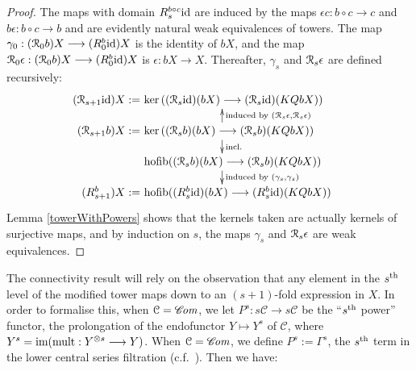 \documentclass[11pt]{amsart} \renewcommand{\baselinestretch}{1.2}
\theoremstyle{plain}
\numberwithin{equation}{section} %
\theoremstyle{plain}
\numberwithin{equation}{chapter} %
\renewcommand{\ker}{\mathrm{ker}\,}
\DeclareMathOperator*{\hofib}{hofib}
\renewcommand{\to}{\longrightarrow}
\newcommand{\scrC}{\mathscr{C}}
\newcommand{\calR}{\mathcal{R}}
\newcommand{\calc}{\mathcal{C}}
\newcommand{\Id}{\mathrm{id}}
\newcommand{\algs}{{\scrC\!\textit{\normalfont\textit{om}}}}
\newcommand{\algcat}{{\calc}}%
\renewcommand{\mapsto}{\longmapsto}
\newcommand{\caldup}[1]{\calR_{\smash{#1}}}
\newcommand{\plainD}{R}
\newcommand{\barConstructionMightAbbreviate}{b}
\begin{document}
\begin{Bousfield-Kan spectral sequence}
\begin{proof}
The maps with domain $\plainD_{\smash{s}}^{\smash{\barConstructionMightAbbreviate \circ c}}\Id $ are induced by the maps $\epsilon c:\barConstructionMightAbbreviate \circ c\to c$ and $\barConstructionMightAbbreviate \epsilon:\barConstructionMightAbbreviate \circ c\to \barConstructionMightAbbreviate $ and are evidently natural weak equivalences of towers. The map $\gamma_0:(\caldup{0}\barConstructionMightAbbreviate )X\to (\plainD_{\smash{0}}^{\smash{\barConstructionMightAbbreviate }}\Id )X$ is the identity of $\barConstructionMightAbbreviate X$, and the map $\caldup{0}\epsilon:(\caldup{0}\barConstructionMightAbbreviate )X\to (\plainD_{\smash{0}}^{\smash{\barConstructionMightAbbreviate }}\Id )X$ is $\epsilon:\barConstructionMightAbbreviate X\to X$. Thereafter, $\gamma_s$ and $\caldup{s}\epsilon$ are defined recursively:
\[\qquad \quad \xymatrix@R=4mm{
\makebox[0cm][r]{$(\caldup{s+1}\Id )X:=\,$}\makebox[5cm][l]{$\,\ker((\caldup{s}\Id )(\barConstructionMightAbbreviate X)\to (\caldup{s}\Id )(KQ\barConstructionMightAbbreviate X))$}\\
\makebox[0cm][r]{$(\caldup{s+1}\barConstructionMightAbbreviate )X:=\,$}\makebox[5cm][l]{$\,\ker((\caldup{s}\barConstructionMightAbbreviate )(\barConstructionMightAbbreviate X)\to (\caldup{s}\barConstructionMightAbbreviate )(KQ\barConstructionMightAbbreviate X))$}\ar[d]^-{\textup{incl.}}_-{}%
\ar[u]_-{\textup{induced by }(\caldup{s}\epsilon,\caldup{s}\epsilon)}^-{}%
\\%
\makebox[5cm][l]{$\,\hofib((\caldup{s}\barConstructionMightAbbreviate )(\barConstructionMightAbbreviate X)\to(\caldup{s}\barConstructionMightAbbreviate )(KQ\barConstructionMightAbbreviate X))$}\ar[d]^-{\textup{induced by }(\gamma_{s},\gamma_{s})}_-{}%
\\%
\makebox[0cm][r]{$(\plainD_{\smash{s+1}}^{\smash{\barConstructionMightAbbreviate }})X:=\,$}\makebox[5cm][l]{$\,\hofib((\plainD_{\smash{s}}^{\smash{\barConstructionMightAbbreviate }}\Id )(\barConstructionMightAbbreviate X)\to (\plainD_{\smash{s}}^{\smash{\barConstructionMightAbbreviate }}\Id )(KQ\barConstructionMightAbbreviate X))$}%
}\]
\noindent Lemma \ref{towerWithPowers} shows that the kernels taken are actually kernels of surjective maps, and by induction on $s$, the maps $\gamma_s$ and $\caldup{s}\epsilon$ are weak equivalences.
\end{proof}
The connectivity result will rely on the observation that any element in the $s^\textup{th}$ level of the modified tower maps down to an $(s+1)$-fold expression in $X$. In order to formalise this, when $\algcat=\algs$, we let $P^s:s\algcat\to s\algcat$ be the ``$s^\textup{th}$ power'' functor, the prolongation of the endofunctor $Y\mapsto Y^s$ of $\algcat$, where $Y^s=\textup{im}(\textup{mult}:Y^{\otimes s}\to Y)$. When $\algcat=\algs$, we define $P^s:=\Gamma^s$, the $s^\textup{th}$ term in the lower central series filtration (c.f.\ \cite{6Author.pdf}). Then we have:

\end{Bousfield-Kan spectral sequence}
\end{document}
